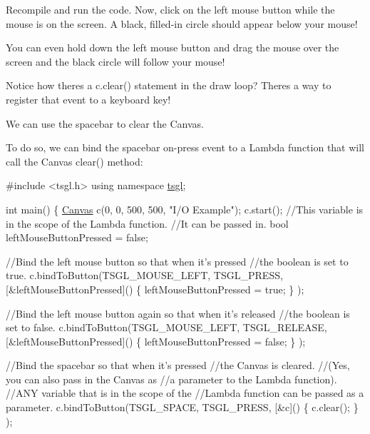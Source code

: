 Recompile and run the code. Now, click on the left mouse button while the mouse is on the screen. A black, filled-\/in circle should appear below your mouse!

You can even hold down the left mouse button and drag the mouse over the screen and the black circle will follow your mouse!

Notice how there\textquotesingle{}s a c.\+clear() statement in the draw loop? There\textquotesingle{}s a way to register that event to a keyboard key!

We can use the spacebar to clear the Canvas.

To do so, we can bind the spacebar on-\/press event to a Lambda function that will call the Canvas clear() method\+:


\begin{DoxyCode}
\textcolor{preprocessor}{#include <tsgl.h>}
\textcolor{keyword}{using namespace }\hyperlink{namespacetsgl}{tsgl};

\textcolor{keywordtype}{int} main() \{
  \hyperlink{classtsgl_1_1_canvas}{Canvas} c(0, 0, 500, 500, \textcolor{stringliteral}{"I/O Example"});
  c.start();
  \textcolor{comment}{//This variable is in the scope of the Lambda function.}
  \textcolor{comment}{//It can be passed in.}
  \textcolor{keywordtype}{bool} leftMouseButtonPressed = \textcolor{keyword}{false};

  \textcolor{comment}{//Bind the left mouse button so that when it's pressed }
  \textcolor{comment}{//the boolean is set to true.}
  c.bindToButton(TSGL\_MOUSE\_LEFT, TSGL\_PRESS, 
                    [&leftMouseButtonPressed]() \{
                          leftMouseButtonPressed = \textcolor{keyword}{true};
                    \}
                );

  \textcolor{comment}{//Bind the left mouse button again so that when it's released }
  \textcolor{comment}{//the boolean is set to false.}
  c.bindToButton(TSGL\_MOUSE\_LEFT, TSGL\_RELEASE, 
                    [&leftMouseButtonPressed]() \{
                          leftMouseButtonPressed = \textcolor{keyword}{false};
                    \}
                );

  \textcolor{comment}{//Bind the spacebar so that when it's pressed }
  \textcolor{comment}{//the Canvas is cleared.}
  \textcolor{comment}{//(Yes, you can also pass in the Canvas as }
  \textcolor{comment}{//a parameter to the Lambda function).}
  \textcolor{comment}{//ANY variable that is in the scope of the }
  \textcolor{comment}{//Lambda function can be passed as a parameter.}
  c.bindToButton(TSGL\_SPACE, TSGL\_PRESS, 
                    [&c]() \{
                      c.clear();
                    \}
                );


\end{DoxyCode}
